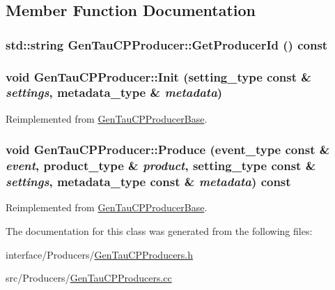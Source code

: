 \subsection{Member Function Documentation}
\hypertarget{classGenTauCPProducer_a5f0ceea95e75cc2144a2cf05829c9bf5}{
\subsubsection[{GetProducerId}]{\setlength{\rightskip}{0pt plus 5cm}std::string GenTauCPProducer::GetProducerId () const}}
\label{classGenTauCPProducer_a5f0ceea95e75cc2144a2cf05829c9bf5}
\hypertarget{classGenTauCPProducer_a23653a610d8e1db8666e35c3793d1eb4}{
\subsubsection[{Init}]{\setlength{\rightskip}{0pt plus 5cm}void GenTauCPProducer::Init (setting\_\-type const \& {\em settings}, \/  metadata\_\-type \& {\em metadata})}}
\label{classGenTauCPProducer_a23653a610d8e1db8666e35c3793d1eb4}


Reimplemented from \hyperlink{classGenTauCPProducerBase_a5eacebc116568fa618c6171e5e04fd09}{GenTauCPProducerBase}.\hypertarget{classGenTauCPProducer_a2ae8772bad72e005ac04ec307f6c1ae0}{
\subsubsection[{Produce}]{\setlength{\rightskip}{0pt plus 5cm}void GenTauCPProducer::Produce (event\_\-type const \& {\em event}, \/  product\_\-type \& {\em product}, \/  setting\_\-type const \& {\em settings}, \/  metadata\_\-type const \& {\em metadata}) const}}
\label{classGenTauCPProducer_a2ae8772bad72e005ac04ec307f6c1ae0}


Reimplemented from \hyperlink{classGenTauCPProducerBase_a99bde6a5233f6794dfac7a744dfa69c5}{GenTauCPProducerBase}.

The documentation for this class was generated from the following files:\begin{DoxyCompactItemize}
\item 
interface/Producers/\hyperlink{GenTauCPProducers_8h}{GenTauCPProducers.h}\item 
src/Producers/\hyperlink{GenTauCPProducers_8cc}{GenTauCPProducers.cc}\end{DoxyCompactItemize}
